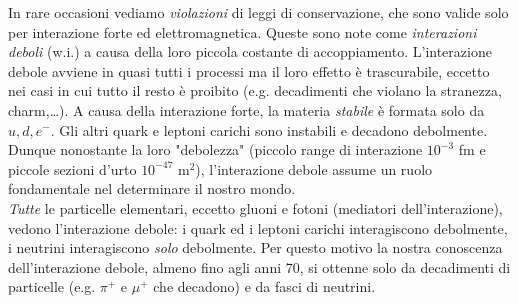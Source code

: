 In rare occasioni vediamo \textit{violazioni} di leggi di conservazione, che sono valide solo per interazione forte ed elettromagnetica. Queste sono note come \textit{interazioni deboli} (w.i.) a causa della loro piccola costante di accoppiamento. L'interazione debole avviene in quasi tutti i processi ma il loro effetto è trascurabile, eccetto nei casi in cui tutto il resto è proibito (e.g. decadimenti che violano la stranezza, charm,\dots). A causa della interazione forte, la materia \textit{stabile} è formata solo da $u,d,e^-$. Gli altri quark e leptoni carichi sono instabili e decadono debolmente. Dunque nonostante la loro "debolezza" (piccolo range di interazione $10^{-3}$ fm e piccole sezioni d'urto $10^{-47}$ m$^2$), l'interazione debole assume un ruolo fondamentale nel determinare il nostro mondo.\\
\textit{Tutte} le particelle elementari, eccetto gluoni e fotoni (mediatori dell'interazione), vedono l'interazione debole: i quark ed i leptoni carichi interagiscono debolmente, i neutrini interagiscono \textit{solo} debolmente. Per questo motivo la nostra conoscenza dell'interazione debole, almeno fino agli anni 70, si ottenne solo da decadimenti di particelle (e.g. $\pi^+$ e $\mu^+$ che decadono) e da fasci di neutrini.
